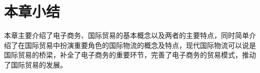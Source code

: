 \section{本章小结}
本章主要介绍了电子商务、国际贸易的基本概念以及两者的主要特点，同时简单介绍了在国际贸易中扮演重要角色的国际物流的概念及特点，现代国际物流可以说是国际贸易的桥梁，补全了电子商务的重要环节，完善了电子商务的贸易模式，推动了国际贸易的发展。
